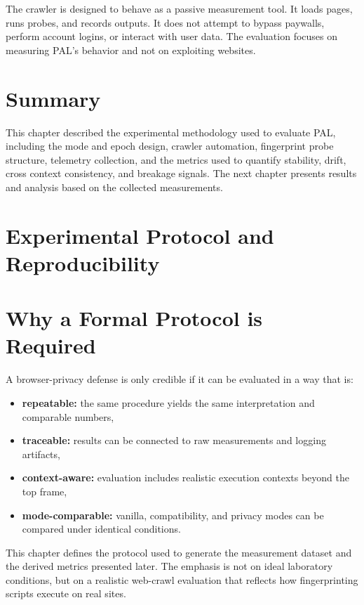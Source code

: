 \documentclass[11pt]{report}
\begin{document}
The crawler is designed to behave as a passive measurement tool. It loads pages, runs probes, and records outputs. It does not attempt to bypass paywalls, perform account logins, or interact with user data. The evaluation focuses on measuring PAL's behavior and not on exploiting websites.

\section{Summary}

This chapter described the experimental methodology used to evaluate PAL, including the mode and epoch design, crawler automation, fingerprint probe structure, telemetry collection, and the metrics used to quantify stability, drift, cross context consistency, and breakage signals. The next chapter presents results and analysis based on the collected measurements.






\section{Experimental Protocol and Reproducibility}

\section{Why a Formal Protocol is Required}

A browser-privacy defense is only credible if it can be evaluated in a way that is:

\begin{itemize}
    \item \textbf{repeatable:} the same procedure yields the same interpretation and comparable numbers,
    \item \textbf{traceable:} results can be connected to raw measurements and logging artifacts,
    \item \textbf{context-aware:} evaluation includes realistic execution contexts beyond the top frame,
    \item \textbf{mode-comparable:} vanilla, compatibility, and privacy modes can be compared under identical conditions.
\end{itemize}

This chapter defines the protocol used to generate the measurement dataset and the derived metrics presented later. The emphasis is not on ideal laboratory conditions, but on a realistic web-crawl evaluation that reflects how fingerprinting scripts execute on real sites.
\end{document}
